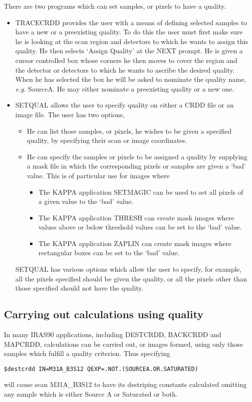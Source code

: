 \documentclass[twoside,11pt]{article}
\begin{document}
There are two programs which can set samples, or pixels to have a quality.
\begin{itemize}
\item TRACECRDD provides the user with a means of defining selected samples to
have a new or a preexisting quality. To do this the user must first make sure he
is looking at the scan region and detectors to which he wants to assign this
quality. He then selects `Assign Quality' at the NEXT prompt. He is given a 
cursor controlled box whose corners he then moves to cover the region and the
detector or detectors to which he wants to ascribe the desired quality. When he 
has selected the box he will be asked to nominate the quality name, {\em e.g.}
 SourceA.
He may either nominate a preexisting quality or a new one. 
\item SETQUAL allows the user to specify quality on either a CRDD file or an
image file. The user has two options, 
\begin{itemize}
\item He can list those samples, or pixels, he wishes to be given a specified 
quality, by specifying their scan or image coordinates.
\item He can specify the samples or pixels to be assigned a quality by 
supplying a mask file in which the corresponding pixels or samples are given a
`bad' value. This is of particular use for images where 
\begin{itemize}
\item The KAPPA application SETMAGIC can be used to set all pixels of a given 
value to the `bad' value.
\item The KAPPA application THRESH can create mask images where values above or
below threshold values can be set to the `bad' value.
\item The KAPPA application ZAPLIN can create mask images where rectangular 
boxes can be set to the `bad' value.
\end{itemize}
\end{itemize}
SETQUAL has various options which allow the user to specify, for example, all 
the pixels specified should be given the quality, or all the pixels other than
those specified should not have the quality.
\end{itemize}
\subsection{Carrying out calculations using quality }
In many IRAS90 applications, including DESTCRDD, BACKCRDD and MAPCRDD, 
calculations can be carried out, or images formed, using only those samples
which fulfill a quality criterion. Thus specifying 
\begin{small}
\begin{verbatim}
$destcrdd IN=M31A_B3S12 QEXP=.NOT.(SOURCEA.OR.SATURATED)
\end{verbatim}
\end{small}
will cause scan M31A\_B3S12 to have its destriping constants calculated omitting
any sample which is either Source A or Saturated or both.
\end{document}
